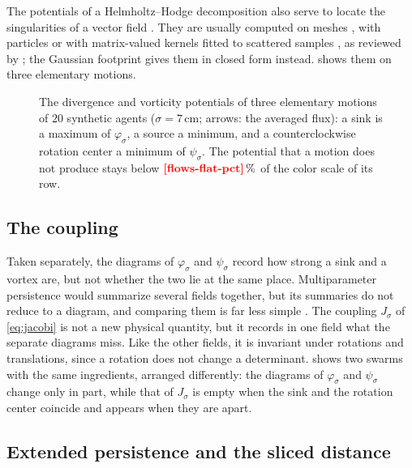 The potentials of a Helmholtz--Hodge decomposition also serve to locate the singularities of a vector field
\citep{polthier2003identifying}. They are usually computed on meshes \citep{polthier2003identifying,tong2003discrete},
with particles \citep{petronetto2010meshless} or with matrix-valued kernels fitted to scattered samples
\citep{macedo2010learning}, as reviewed by \citet{bhatia2013helmholtz}; the Gaussian footprint gives them in closed form
instead.  shows them on three elementary motions.

\begin{figure}[!htbp]
\centering
{}
\caption{The divergence and vorticity potentials of three elementary motions of $20$ synthetic agents ($\sigma=7$\,cm;
arrows: the averaged flux): a sink is a maximum of $\varphi_\sigma$, a source a minimum, and a counterclockwise
rotation center a minimum of $\psi_\sigma$. The potential that a motion does not produce stays below
$\nm{flows-flat-pct}\,\%$ of the color scale of its row.}
\label{fig:flows}
\end{figure}
\FloatBarrier

\subsection{The coupling}

Taken separately, the diagrams of $\varphi_\sigma$ and $\psi_\sigma$ record how strong a sink and a vortex are, but not
whether the two lie at the same place. Multiparameter persistence would summarize several fields together, but its
summaries do not reduce to a diagram, and comparing them is far less simple
\citep{carlsson2009theory,botnan2023introduction}. The coupling $J_\sigma$ of \eqref{eq:jacobi} is not a new physical
quantity, but it records in one field what the separate diagrams miss. Like the other fields, it is invariant under
rotations and translations, since a rotation does not change a determinant.  shows two swarms with
the same ingredients, arranged differently: the diagrams of $\varphi_\sigma$ and $\psi_\sigma$ change only in part, while
that of $J_\sigma$ is empty when the sink and the rotation center coincide and appears when they are apart.


\subsection{Extended persistence and the sliced distance}

